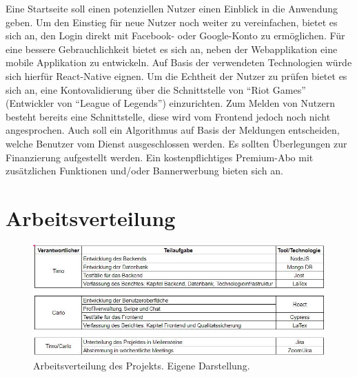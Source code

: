 Eine Startseite soll einen potenziellen Nutzer einen Einblick in die Anwendung geben.
Um den Einstieg für neue Nutzer noch weiter zu vereinfachen, bietet es sich an, den Login direkt mit Facebook- oder Google-Konto zu ermöglichen.
Für eine bessere Gebrauchlichkeit %
bietet es sich an, neben der Webapplikation eine mobile Applikation zu entwickeln.
Auf Basis der verwendeten Technologien würde sich hierfür React-Native eignen.
Um die Echtheit der Nutzer zu prüfen bietet es sich an, eine Kontovalidierung über die Schnittstelle von \enquote{Riot Games} (Entwickler von \enquote{League of Legends}) einzurichten.
Zum Melden von Nutzern besteht bereits eine Schnittstelle, diese wird vom Frontend jedoch noch nicht angesprochen.
Auch soll ein Algorithmus auf Basis der Meldungen entscheiden, welche Benutzer vom Dienst ausgeschlossen werden.
Es sollten Überlegungen zur Finanzierung aufgestellt werden.
Ein kostenpflichtiges Premium-Abo mit zusätzlichen Funktionen und/oder Bannerwerbung bieten sich an.

\section*{Arbeitsverteilung}

\begin{figure}[h!]
    \centering
    \includegraphics[scale=0.55]{sources/Arbeitsverteilung}
    \caption{Arbeitsverteilung des Projekts. Eigene Darstellung.}
    \label{fig:Antwort_Serverabfrage} 
  \end{figure}